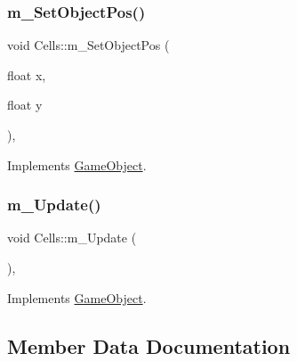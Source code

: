 \mbox{\label{class_cells_a5d900205d8d5fc3d3b41b664d51994c4}} 
\subsubsection{\texorpdfstring{m\+\_\+\+Set\+Object\+Pos()}{m\_SetObjectPos()}}
{\footnotesize\ttfamily void Cells\+::m\+\_\+\+Set\+Object\+Pos (\begin{DoxyParamCaption}\item[{float}]{x,  }\item[{float}]{y }\end{DoxyParamCaption})\hspace{0.3cm}{\ttfamily [override]}, {\ttfamily [virtual]}}



Implements \mbox{\hyperlink{class_game_object_ad1f8ea8eb3673b1af8215bf92cdc0df8}{Game\+Object}}.

\mbox{\label{class_cells_a524d410412de7030016b99a4d8b0c1cc}} 
\subsubsection{\texorpdfstring{m\+\_\+\+Update()}{m\_Update()}}
{\footnotesize\ttfamily void Cells\+::m\+\_\+\+Update (\begin{DoxyParamCaption}{ }\end{DoxyParamCaption})\hspace{0.3cm}{\ttfamily [override]}, {\ttfamily [virtual]}}



Implements \mbox{\hyperlink{class_game_object_a3af5a7b470e09f13a1422439fc6a9ba8}{Game\+Object}}.



\subsection{Member Data Documentation}
\mbox{\label{class_cells_a0bc31e333f70a4d5aefd1fa5e14fa0fb}} 
